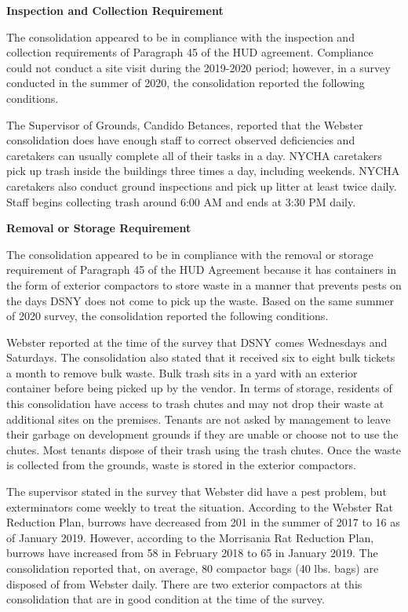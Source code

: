 

\textbf{Inspection and Collection Requirement}

The consolidation appeared to be in compliance with the inspection and collection requirements of Paragraph 45 of the HUD agreement. Compliance could not conduct a site visit during the 2019-2020 period; however, in a survey conducted in the summer of 2020, the consolidation reported the following conditions.

The Supervisor of Grounds, Candido Betances, reported that the Webster consolidation does have enough staff to correct observed deficiencies and caretakers can usually complete all of their tasks in a day. NYCHA caretakers pick up trash inside the buildings three times a day, including weekends. NYCHA caretakers also conduct ground inspections and pick up litter at least twice daily. Staff begins collecting trash around 6:00 AM and ends at 3:30 PM daily. 

\textbf{Removal or Storage Requirement}

The consolidation appeared to be in compliance with the removal or storage requirement of Paragraph  45 of the HUD Agreement because it has containers in the form of exterior compactors to store waste in a manner that prevents pests on the days DSNY does not come to pick up the waste. Based on the same summer of  2020 survey, the consolidation reported the following conditions.

Webster reported at the time of the survey that DSNY comes Wednesdays and Saturdays. The consolidation also stated that it received six to eight bulk tickets a month to remove bulk waste. Bulk trash sits in a yard with an exterior container before being picked up by the vendor. In terms of storage, residents of this consolidation have access to trash chutes and may not drop their waste at additional sites on the premises. Tenants are not asked by management to leave their garbage on development grounds if they are unable or choose not to use the chutes. Most tenants dispose of their trash using the trash chutes. Once the waste is collected from the grounds, waste is stored in the exterior compactors.  

The supervisor stated in the survey that Webster did have a pest problem, but exterminators come weekly to treat the situation. According to the Webster Rat Reduction Plan, burrows have decreased from 201 in the summer of 2017 to 16 as of January 2019. However, according to the Morrisania Rat Reduction Plan, burrows have increased from 58 in February 2018 to 65 in January 2019. The consolidation reported that, on average, 80 compactor bags (40 lbs. bags) are disposed of from Webster daily. There are two exterior compactors at this consolidation that are in good condition at the time of the survey.

